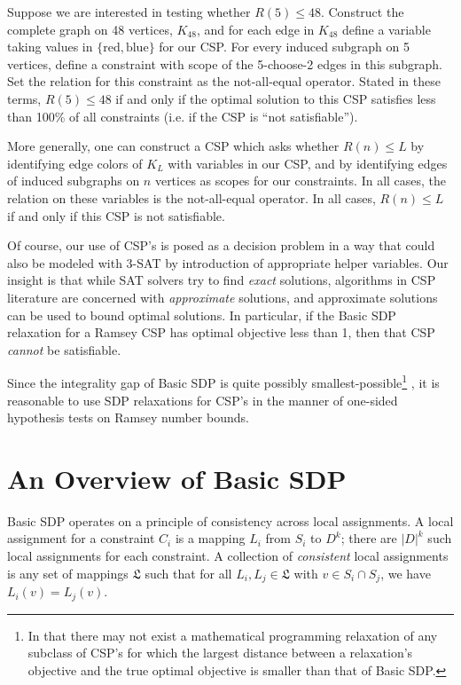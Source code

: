 \documentclass[12pt]{article} %
\begin{document}
Suppose we are interested in testing whether $R(5) \leq 48$. Construct the complete graph on 48 vertices, $K_{48}$, and for each edge in $K_{48}$ define a variable taking values in $\{\text{red},\text{blue}\}$ for our CSP. For every induced subgraph on 5 vertices, define a constraint with scope of the 5-choose-2 edges in this subgraph. Set the relation for this constraint as the not-all-equal operator. Stated in these terms, $R(5) \leq 48$ if and only if the optimal solution to this CSP satisfies less than 100\% of all constraints (i.e. if the CSP is ``not satisfiable'').

More generally, one can construct a CSP which asks whether $R(n) \leq L$ by identifying edge colors of $K_L$ with variables in our CSP, and by identifying edges of induced subgraphs on $n$ vertices as scopes for our constraints. In all cases, the relation on these variables is the not-all-equal operator. In all cases, $R(n) \leq L$ if and only if this CSP is not satisfiable.

Of course, our use of CSP's is posed as a decision problem in a way that could also be modeled with 3-SAT by introduction of appropriate helper variables. Our insight is that while SAT solvers try to find \textit{exact} solutions, algorithms in CSP literature are concerned with \textit{approximate} solutions, and approximate solutions can be used to bound optimal solutions. In particular, if the Basic SDP relaxation for a Ramsey CSP has optimal objective less than 1, then that CSP \textit{cannot} be satisfiable. 

Since the integrality gap of Basic SDP is quite possibly smallest-possible\footnote{In that there may not exist a mathematical programming relaxation of any subclass of CSP's for which the largest distance between a relaxation's objective and the true optimal objective is smaller than that of Basic SDP.} \cite{raghavendra2008optimal}, it is reasonable to use SDP relaxations for CSP's in the manner of one-sided hypothesis tests on Ramsey number bounds.

\section{An Overview of Basic SDP}

Basic SDP operates on a principle of consistency across local assignments. A local assignment for a constraint $C_i$ is a mapping $L_i$ from $S_i$ to $D^{k}$; there are $|D|^k$ such local assignments for each constraint. A collection of \textit{consistent} local assignments is any set of mappings $\mathfrak{L}$ such that for all $L_i, L_j \in \mathfrak{L}$ with $v \in S_i \cap S_j$, we have $L_i(v) = L_j(v)$.
\end{document}
